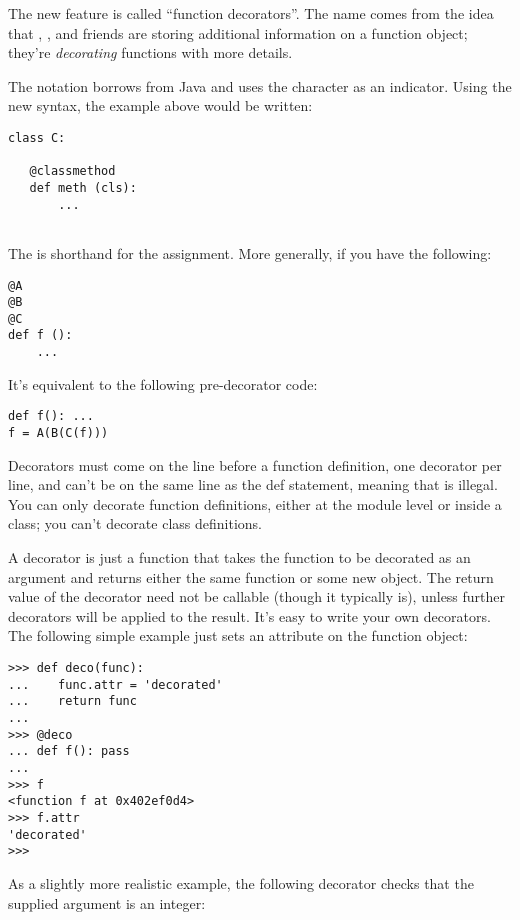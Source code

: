 \documentclass{howto}
\begin{document}
The new feature is called ``function decorators''.  The name comes
from the idea that , ,
and friends are storing additional information on a function object;
they're \emph{decorating} functions with more details.

The notation borrows from Java and uses the  character as an
indicator.  Using the new syntax, the example above would be written:

\begin{verbatim}
class C:

   @classmethod
   def meth (cls):
       ...
   
\end{verbatim}

The  is shorthand for the
 assignment.  More generally, if you have
the following:

\begin{verbatim}
@A
@B
@C
def f ():
    ...
\end{verbatim}

It's equivalent to the following pre-decorator code:

\begin{verbatim}
def f(): ...
f = A(B(C(f)))
\end{verbatim}

Decorators must come on the line before a function definition, one decorator
per line, and can't be on the same line as the def statement, meaning that
 is illegal.  You can only decorate function
definitions, either at the module level or inside a class; you can't
decorate class definitions.

A decorator is just a function that takes the function to be decorated as an
argument and returns either the same function or some new object.  The
return value of the decorator need not be callable (though it typically is),
unless further decorators will be applied to the result.  It's easy to write
your own decorators.  The following simple example just sets an attribute on
the function object:

\begin{verbatim}
>>> def deco(func):
...    func.attr = 'decorated'
...    return func
...
>>> @deco
... def f(): pass
...
>>> f
<function f at 0x402ef0d4>
>>> f.attr
'decorated'
>>>
\end{verbatim}

As a slightly more realistic example, the following decorator checks
that the supplied argument is an integer:
\end{document}
